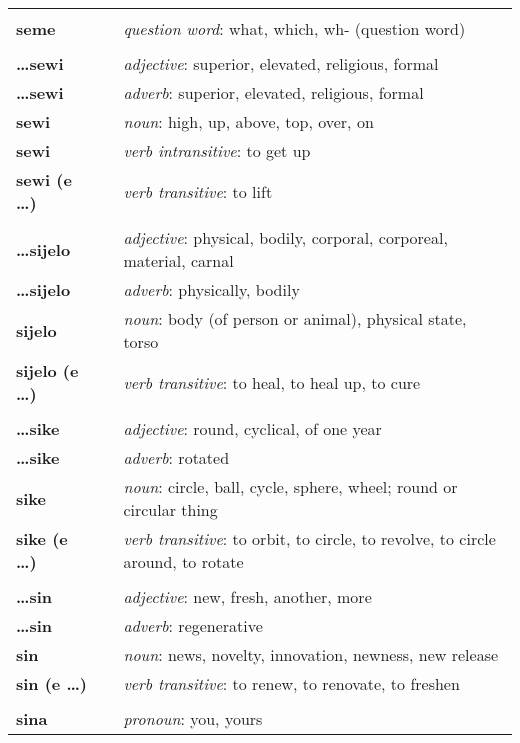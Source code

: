 \begin{supertabular}{p{2,5cm}|ll}
 && \\ %
\textbf{seme} && \textit{question word}: what, which, wh- (question word) \\ 
 && \\ %
\textbf{\dots sewi} && \textit{adjective}: superior, elevated, religious, formal \\ 
\textbf{\dots sewi} && \textit{adverb}: superior, elevated, religious, formal \\ 
\textbf{sewi} && \textit{noun}: high, up, above, top, over, on \\ 
\textbf{sewi} && \textit{verb intransitive}: to get up \\ 
\textbf{sewi (e \dots)} && \textit{verb transitive}: to lift \\ 
 && \\ %
\textbf{\dots sijelo} && \textit{adjective}: physical, bodily, corporal, corporeal, material, carnal \\ 
\textbf{\dots sijelo} && \textit{adverb}: physically, bodily \\ 
\textbf{sijelo} && \textit{noun}: body (of person or animal), physical state, torso \\ 
\textbf{sijelo (e \dots)} && \textit{verb transitive}: to heal, to heal up, to cure \\ 
 && \\ %
\textbf{\dots sike} && \textit{adjective}: round, cyclical, of one year \\ 
\textbf{\dots sike} && \textit{adverb}: rotated \\ 
\textbf{sike} && \textit{noun}: circle, ball, cycle, sphere, wheel; round or circular thing \\ 
\textbf{sike (e \dots)} && \textit{verb transitive}: to orbit, to circle, to revolve, to circle around, to rotate \\ 
 && \\ %
\textbf{\dots sin} && \textit{adjective}: new, fresh, another, more \\ 
\textbf{ \dots sin } && \textit{adverb}: regenerative \\ 
\textbf{sin} && \textit{noun}: news, novelty, innovation, newness, new release \\ 
\textbf{sin (e \dots)} && \textit{verb transitive}: to renew, to renovate, to freshen \\ 
 && \\ %
\textbf{sina} && \textit{pronoun}: you, yours \\ 

\end{supertabular}
